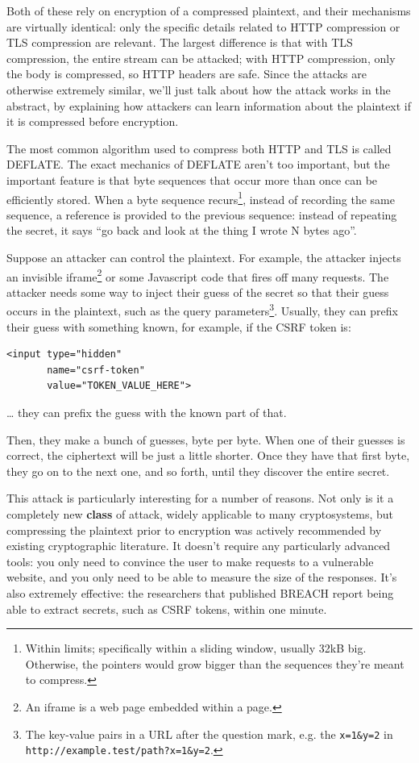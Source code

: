 \documentclass[11pt,ebook,table,dvipsnames]{memoir}
\begin{document}
Both of these rely on encryption of a compressed plaintext, and their
mechanisms are virtually identical: only the specific details related
to HTTP compression or TLS compression are relevant. The largest
difference is that with TLS compression, the entire stream can be
attacked; with HTTP compression, only the body is compressed, so HTTP
headers are safe. Since the attacks are otherwise extremely similar,
we'll just talk about how the attack works in the abstract, by
explaining how attackers can learn information about the plaintext if
it is compressed before encryption.

The most common algorithm used to compress both HTTP and
TLS\cite{rfc3749:tlscompression} is called DEFLATE. The exact
mechanics of DEFLATE aren't too important, but the important feature
is that byte sequences that occur more than once can be efficiently
stored. When a byte sequence recurs\footnote{Within limits; specifically
within a sliding window, usually 32kB big. Otherwise, the pointers
would grow bigger than the sequences they're meant to compress.},
instead of recording the same sequence, a reference is provided to the
previous sequence: instead of repeating the secret, it says \enquote{go back
and look at the thing I wrote N bytes ago}.

Suppose an attacker can control the plaintext. For example, the
attacker injects an invisible iframe\footnote{An iframe is a web page
embedded within a page.} or some Javascript code that fires off many
requests. The attacker needs some way to inject their guess of the
secret so that their guess occurs in the plaintext, such as the query
parameters\footnote{The key-value pairs in a URL after the question mark,
e.g. the \texttt{x=1\&y=2} in \texttt{http://example.test/path?x=1\&y=2}.}. Usually,
they can prefix their guess with something known, for example, if the
CSRF token is:

\begin{verbatim}
<input type="hidden"
       name="csrf-token"
       value="TOKEN_VALUE_HERE">
\end{verbatim}

\ldots{} they can prefix the guess with the known part of that.

Then, they make a bunch of guesses, byte per byte. When one of their
guesses is correct, the ciphertext will be just a little shorter.
Once they have that first byte, they go on to the next one, and so
forth, until they discover the entire secret.

This attack is particularly interesting for a number of reasons. Not
only is it a completely new \textbf{class} of attack, widely applicable to
many cryptosystems, but compressing the plaintext prior to encryption
was actively recommended by existing cryptographic literature. It
doesn't require any particularly advanced tools: you only need to
convince the user to make requests to a vulnerable website, and you
only need to be able to measure the size of the responses. It's also
extremely effective: the researchers that published BREACH report
being able to extract secrets, such as CSRF tokens, within one minute.
\end{document}
